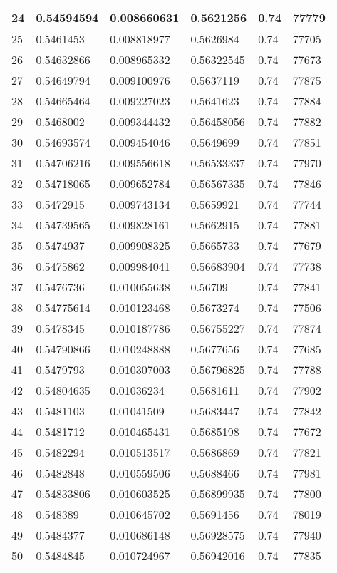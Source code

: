 \begin{longtable}{|l|l|l|l|l|l|}
24 & 0.54594594 & 0.008660631 & 0.5621256 & 0.74 & 77779 \\ \hline 
25 & 0.5461453 & 0.008818977 & 0.5626984 & 0.74 & 77705 \\ \hline 
26 & 0.54632866 & 0.008965332 & 0.56322545 & 0.74 & 77673 \\ \hline 
27 & 0.54649794 & 0.009100976 & 0.5637119 & 0.74 & 77875 \\ \hline 
28 & 0.54665464 & 0.009227023 & 0.5641623 & 0.74 & 77884 \\ \hline 
29 & 0.5468002 & 0.009344432 & 0.56458056 & 0.74 & 77882 \\ \hline 
30 & 0.54693574 & 0.009454046 & 0.5649699 & 0.74 & 77851 \\ \hline 
31 & 0.54706216 & 0.009556618 & 0.56533337 & 0.74 & 77970 \\ \hline 
32 & 0.54718065 & 0.009652784 & 0.56567335 & 0.74 & 77846 \\ \hline 
33 & 0.5472915 & 0.009743134 & 0.5659921 & 0.74 & 77744 \\ \hline 
34 & 0.54739565 & 0.009828161 & 0.5662915 & 0.74 & 77881 \\ \hline 
35 & 0.5474937 & 0.009908325 & 0.5665733 & 0.74 & 77679 \\ \hline 
36 & 0.5475862 & 0.009984041 & 0.56683904 & 0.74 & 77738 \\ \hline 
37 & 0.5476736 & 0.010055638 & 0.56709 & 0.74 & 77841 \\ \hline 
38 & 0.54775614 & 0.010123468 & 0.5673274 & 0.74 & 77506 \\ \hline 
39 & 0.5478345 & 0.010187786 & 0.56755227 & 0.74 & 77874 \\ \hline 
40 & 0.54790866 & 0.010248888 & 0.5677656 & 0.74 & 77685 \\ \hline 
41 & 0.5479793 & 0.010307003 & 0.56796825 & 0.74 & 77788 \\ \hline 
42 & 0.54804635 & 0.01036234 & 0.5681611 & 0.74 & 77902 \\ \hline 
43 & 0.5481103 & 0.01041509 & 0.5683447 & 0.74 & 77842 \\ \hline 
44 & 0.5481712 & 0.010465431 & 0.5685198 & 0.74 & 77672 \\ \hline 
45 & 0.5482294 & 0.010513517 & 0.5686869 & 0.74 & 77821 \\ \hline 
46 & 0.5482848 & 0.010559506 & 0.5688466 & 0.74 & 77981 \\ \hline 
47 & 0.54833806 & 0.010603525 & 0.56899935 & 0.74 & 77800 \\ \hline 
48 & 0.548389 & 0.010645702 & 0.5691456 & 0.74 & 78019 \\ \hline 
49 & 0.5484377 & 0.010686148 & 0.56928575 & 0.74 & 77940 \\ \hline 
50 & 0.5484845 & 0.010724967 & 0.56942016 & 0.74 & 77835 \\ \hline 
\end{longtable}
